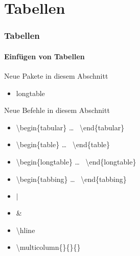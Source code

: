 \section{Tabellen}

\begin{frame}
\frametitle{Tabellen}
\framesubtitle{Einf\"ugen von Tabellen}

\begin{exampleblock}{Neue Pakete in diesem Abschnitt}
\begin{itemize}
\item longtable
\end{itemize}
\end{exampleblock}

\begin{block}{Neue Befehle in diesem Abschnitt}
\begin{itemize}
\item \color{unibablueI}\textbackslash begin\color{black}\{tabular\} \dots
~\color{unibablueI}\textbackslash end\color{black}\{tabular\}
\item \color{unibablueI}\textbackslash begin\color{black}\{table\} \dots
~\color{unibablueI}\textbackslash end\color{black}\{table\}
\item \color{unibablueI}\textbackslash begin\color{black}\{longtable\} \dots
~\color{unibablueI}\textbackslash end\color{black}\{longtable\}
\item \color{unibablueI}\textbackslash begin\color{black}\{tabbing\} \dots
~\color{unibablueI}\textbackslash end\color{black}\{tabbing\}
\item \color{nounibaredI}$|$\color{black}
\item \color{nounibaredI}\& \color{black}
\item \color{nounibaredI}\textbackslash hline\color{black}
\item \color{nounibaredI}\textbackslash multicolumn\color{black}\{\}\{\}\{\}
\end{itemize}
\end{block}

\end{frame}

